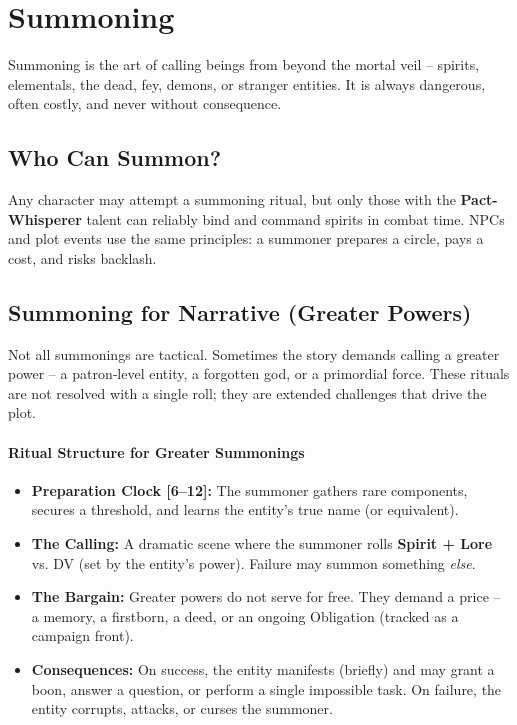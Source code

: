 \section{Summoning}
\label{sec:summoning}

Summoning is the art of calling beings from beyond the mortal veil -- spirits, elementals, the dead, fey, demons, or stranger entities. It is always dangerous, often costly, and never without consequence.

\subsection{Who Can Summon?}

Any character may attempt a summoning ritual, but only those with the \textbf{Pact-Whisperer} talent can reliably bind and command spirits in combat time. NPCs and plot events use the same principles: a summoner prepares a circle, pays a cost, and risks backlash.

\subsection{Summoning for Narrative (Greater Powers)}

Not all summonings are tactical. Sometimes the story demands calling a greater power -- a patron‑level entity, a forgotten god, or a primordial force. These rituals are not resolved with a single roll; they are extended challenges that drive the plot.

\paragraph{Ritual Structure for Greater Summonings}
\begin{itemize}
  \item \textbf{Preparation Clock [6--12]:} The summoner gathers rare components, secures a threshold, and learns the entity's true name (or equivalent).
  \item \textbf{The Calling:} A dramatic scene where the summoner rolls \textbf{Spirit + Lore} vs. DV (set by the entity's power). Failure may summon something \emph{else}.
  \item \textbf{The Bargain:} Greater powers do not serve for free. They demand a price -- a memory, a firstborn, a deed, or an ongoing Obligation (tracked as a campaign front).
  \item \textbf{Consequences:} On success, the entity manifests (briefly) and may grant a boon, answer a question, or perform a single impossible task. On failure, the entity corrupts, attacks, or curses the summoner.
\end{itemize}

